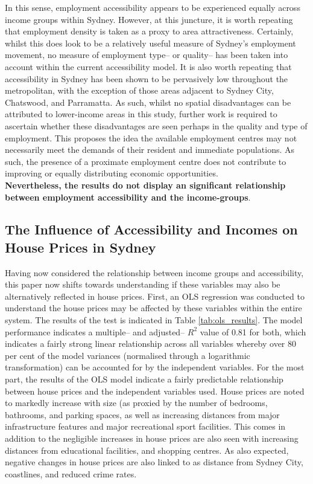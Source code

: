 In this sense, employment accessibility appears to be experienced equally across income groups within Sydney. However, at this juncture, it is worth repeating that employment density is taken as a proxy to area attractiveness. Certainly, whilst this does look to be a relatively useful measure of Sydney's employment movement, no measure of employment type-- or quality-- has been taken into account within the current accessibility model. It is also worth repeating that accessibility in Sydney has been shown to be pervasively low throughout the metropolitan, with the exception of those areas adjacent to Sydney City, Chatswood, and Parramatta. As such, whilst no spatial disadvantages can be attributed to lower-income areas in this study, further work is required to ascertain whether these disadvantages are seen perhaps in the quality and type of employment. This proposes the idea the available employment centres may not necessarily meet the demands of their resident and immediate populations. As such, the presence of a proximate employment centre does not contribute to improving or equally distributing economic opportunities. \\

\textbf{Nevertheless, the results do not display an significant relationship between employment accessibility and the income-groups}.

\subsection{The Influence of Accessibility and Incomes on House Prices in Sydney}

Having now considered the relationship between income groups and accessibility, this paper now shifts towards understanding if these variables may also be alternatively reflected in house prices. First, an OLS regression was conducted to understand the house prices may be affected by these variables within the entire system. The results of the test is indicated in Table \ref{tab:ols_results}. The model performance indicates a multiple-- and adjusted-- $R^2$ value of 0.81 for both, which indicates a fairly strong linear relationship across all variables whereby over 80 per cent of the model variances (normalised through a logarithmic transformation) can be accounted for by the independent variables. For the most part, the results of the OLS model indicate a fairly predictable relationship between house prices and the independent variables used. House prices are noted to markedly increase with size (as proxied by the number of bedrooms, bathrooms, and parking spaces, as well as increasing distances from major infrastructure features and major recreational sport facilities. This comes in addition to the negligible increases in house prices are also seen with increasing distances from educational facilities, and shopping centres. As also expected, negative changes in house prices are also linked to as distance from Sydney City, coastlines, and reduced crime rates. \\


